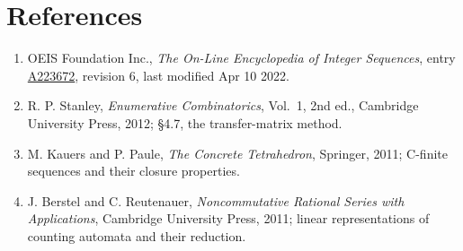 \documentclass[11pt]{article}
\theoremstyle{definition}
\begin{document}
\section{References}

\begin{enumerate}

\item OEIS Foundation Inc., \emph{The On-Line Encyclopedia of Integer Sequences}, entry \href{https://oeis.org/A223672}{A223672}, revision 6, last modified Apr 10 2022.

\item R. P. Stanley, \emph{Enumerative Combinatorics}, Vol.~1, 2nd ed., Cambridge University Press, 2012; \S4.7, the transfer-matrix method.

\item M. Kauers and P. Paule, \emph{The Concrete Tetrahedron}, Springer, 2011; C-finite sequences and their closure properties.

\item J. Berstel and C. Reutenauer, \emph{Noncommutative Rational Series with Applications}, Cambridge University Press, 2011; linear representations of counting automata and their reduction.

\end{enumerate}
\end{document}
